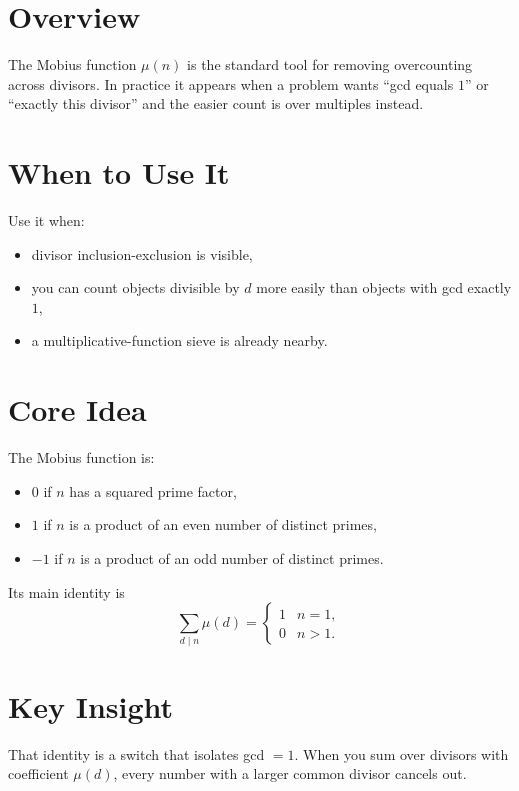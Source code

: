 \section*{Overview}

The Mobius function \(\mu(n)\) is the standard tool for removing overcounting across divisors. In practice it appears
when a problem wants ``gcd equals \(1\)'' or ``exactly this divisor'' and the easier count is over multiples instead.

\section*{When to Use It}

Use it when:

\begin{itemize}
  \item divisor inclusion-exclusion is visible,
  \item you can count objects divisible by \(d\) more easily than objects with gcd exactly \(1\),
  \item a multiplicative-function sieve is already nearby.
\end{itemize}

\section*{Core Idea}

The Mobius function is:

\begin{itemize}
  \item \(0\) if \(n\) has a squared prime factor,
  \item \(1\) if \(n\) is a product of an even number of distinct primes,
  \item \(-1\) if \(n\) is a product of an odd number of distinct primes.
\end{itemize}

Its main identity is
\[
\sum_{d \mid n} \mu(d) =
\begin{cases}
1 & n = 1, \\
0 & n > 1.
\end{cases}
\]

\section*{Key Insight}

That identity is a switch that isolates gcd \(=1\). When you sum over divisors with coefficient \(\mu(d)\), every number
with a larger common divisor cancels out.

